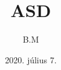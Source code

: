 \documentclass{article}
\begin{document}
\title{ASD}
\author{B.M}
\date{2020. július 7.}
\maketitle
\hulipsum
\end{document}
